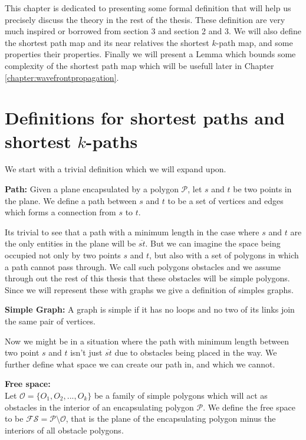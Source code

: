 \label{chapter:shortestpathmap}

This chapter is dedicated to presenting some formal definition that will help us
precisely discuss the theory in the rest of the thesis. These definition are very much
inspired or borrowed from \cite{HershbergerS99} section 3 and \cite{HershbergerKS17}
section 2 and 3. We will also define the shortest path map and its near relatives the 
shortest $k$-path map, and some properties their properties. Finally we will present a 
Lemma which bounds some complexity of the shortest path map which will be usefull 
later in Chapter \ref{chapter:wavefrontpropagation}.

\section{Definitions for shortest paths and shortest $k$-paths}

We start with a trivial definition which we will expand upon.

\begin{mydef}\textbf{Path:}
Given a plane encapsulated by a polygon $\mathcal{P}$, let $s$ and $t$ be two
	points in the plane. We define a path between $s$ and $t$ to be a set of
	vertices and edges which forms a connection from $s$ to $t$.
\end{mydef}

Its trivial to see that a path with a minimum length in the case where $s$ and $t$
are the only entities in the plane will be $\overline{st}$. But we can imagine the
space being occupied not only by two points $s$ and $t$, but also with a set of 
polygons in which a path cannot pass through. We call such polygons obstacles and
we assume through out the rest of this thesis that these obstacles will be 
simple polygons. Since we will represent these with graphs we give a definition of 
simples graphs.

\begin{mydef}\textbf{Simple Graph:}
  A graph is simple if it has no loops and no two of its links join the same pair
  of vertices.
\end{mydef}

Now we might be in a situation where the path with minimum length between two point 
$s$ and $t$ isn't just $\overline{st}$ due to obstacles being placed in the way. We 
further define what space we can create our path in, and which we cannot.

\begin{mydef} 
	\textbf{Free space:}\\ 
	Let $\mathcal{O}=\{O_1,O_2,...,O_k\}$ be a
	family of simple polygons which will act as obstacles in the interior of an
	encapsulating polygon $\mathcal{P}$. We define the free space to be
	$\mathcal{FS}=\mathcal{P}\setminus\mathcal{O}$, that is the plane of the
	encapsulating polygon minus the interiors of all obstacle polygons.
\end{mydef}

